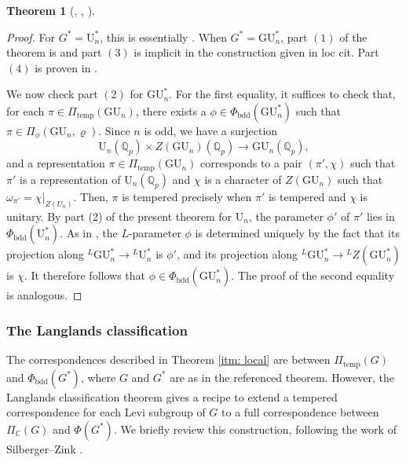 \documentclass[reqno,11pt]{amsart}
\newtheorem{theorem}{Theorem}[section]
\theoremstyle{remark}
\newcommand{\GU}{\mathrm{GU}}
\newcommand{\U}{\mathrm{U}}
\newcommand{\C}{\mathbb{C}}
\newcommand{\Q}{\mathbb{Q}}
\newcommand{\temp}{\mathrm{temp}}
\newcommand{\bdd}{\mathrm{bdd}}
\begin{document}
\begin{theorem}[{\cite[Theorem 1.6.1]{KMSW}, \cite[Theorem 2.5.1, Theorem 3.2.1]{Mok}, \cite[Theorem 2.16, \S 3]{BMN}}]
\begin{enumerate}
\end{enumerate}
\end{theorem}
\begin{proof}
For $G^*=\U^*_n$, this is essentially \cite[Theorem 1.6.1]{KMSW}. When $G^*= \GU^*_n$, part $(1)$  of the theorem is \cite[Theorem 2.16]{BMN} and part $(3)$ is implicit in the construction given in loc cit.  Part $(4)$ is proven in \cite[\S 3]{BMN}.

We now check part $(2)$ for $\GU^*_n$. For the first equality, it suffices to check that, for each $\pi \in \Pi_{\temp}(\GU_n)$, there exists a $\phi \in \Phi_{\bdd}(\GU^*_n)$ such that $\pi \in \Pi_{\phi}(\GU_n, \varrho)$. Since $n$ is odd, we have a surjection
\begin{equation*}
    \U_n(\Q_p) \times Z(\GU_n)(\Q_p) \to \GU_n(\Q_p),
\end{equation*}
and a representation $\pi \in \Pi_{\temp}(\GU_n)$ corresponds to a pair $(\pi', \chi)$ such that $\pi'$ is a representation of $\U_n(\Q_p)$ and $\chi$ is a character of $Z(\GU_n)$ such that $\omega_{\pi'} = \chi|_{Z(U_n)}$. Then, $\pi$ is tempered precisely when $\pi'$ is tempered and $\chi$ is unitary. By part (2) of the present theorem for $\U_n$, the parameter $\phi'$ of $\pi'$ lies in $\Phi_{\bdd}(\U^*_n)$. As in \cite[\S 2.3]{BMN}, the $L$-parameter $\phi$ is determined uniquely by the fact that its projection along ${}^L\GU^*_n \to {}^L\U^*_n$ is $\phi'$, and its projection along ${}^L\GU^*_n \to {}^LZ(\GU^*_n)$ is $\chi$. It therefore follows that $\phi \in \Phi_{\bdd}(\GU^*_n)$. The proof of the second equality is analogous.
\end{proof}


\subsubsection{The Langlands classification}

The correspondences described in Theorem \ref{itm: local} are between $\Pi_{\temp}(G)$ and $\Phi_{\bdd}(G^*)$, where $G$ and $G^*$ are as in the referenced theorem. However, the Langlands classification theorem gives a recipe to extend a tempered correspondence for each Levi subgroup of $G$ to a full correspondence between $\Pi_{\C}(G)$ and $\Phi(G^*)$. We briefly review this construction, following the work of Silberger--Zink \cite{SZ}.
\end{document}
